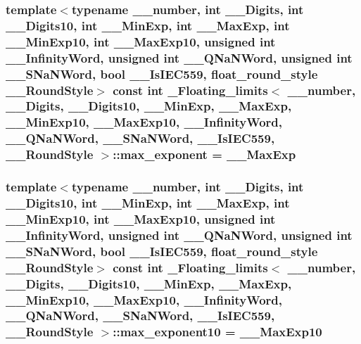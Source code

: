 \subsubsection[{max\+\_\+exponent}]{\setlength{\rightskip}{0pt plus 5cm}template$<$typename \+\_\+\+\_\+number, int \+\_\+\+\_\+\+Digits, int \+\_\+\+\_\+\+Digits10, int \+\_\+\+\_\+\+Min\+Exp, int \+\_\+\+\_\+\+Max\+Exp, int \+\_\+\+\_\+\+Min\+Exp10, int \+\_\+\+\_\+\+Max\+Exp10, unsigned int \+\_\+\+\_\+\+Infinity\+Word, unsigned int \+\_\+\+\_\+\+Q\+Na\+N\+Word, unsigned int \+\_\+\+\_\+\+S\+Na\+N\+Word, bool \+\_\+\+\_\+\+Is\+I\+E\+C559, float\+\_\+round\+\_\+style \+\_\+\+\_\+\+Round\+Style$>$ const int {\bf \+\_\+\+Floating\+\_\+limits}$<$ \+\_\+\+\_\+number, \+\_\+\+\_\+\+Digits, \+\_\+\+\_\+\+Digits10, \+\_\+\+\_\+\+Min\+Exp, \+\_\+\+\_\+\+Max\+Exp, \+\_\+\+\_\+\+Min\+Exp10, \+\_\+\+\_\+\+Max\+Exp10, \+\_\+\+\_\+\+Infinity\+Word, \+\_\+\+\_\+\+Q\+Na\+N\+Word, \+\_\+\+\_\+\+S\+Na\+N\+Word, \+\_\+\+\_\+\+Is\+I\+E\+C559, \+\_\+\+\_\+\+Round\+Style $>$\+::max\+\_\+exponent = \+\_\+\+\_\+\+Max\+Exp\hspace{0.3cm}{\ttfamily [static]}}\label{class__Floating__limits_a255ad0aea1d240e3f78d370b76984e2a}
\hypertarget{class__Floating__limits_a7e0e6cfca6c88235b2b5d3e09eae456d}{}
\subsubsection[{max\+\_\+exponent10}]{\setlength{\rightskip}{0pt plus 5cm}template$<$typename \+\_\+\+\_\+number, int \+\_\+\+\_\+\+Digits, int \+\_\+\+\_\+\+Digits10, int \+\_\+\+\_\+\+Min\+Exp, int \+\_\+\+\_\+\+Max\+Exp, int \+\_\+\+\_\+\+Min\+Exp10, int \+\_\+\+\_\+\+Max\+Exp10, unsigned int \+\_\+\+\_\+\+Infinity\+Word, unsigned int \+\_\+\+\_\+\+Q\+Na\+N\+Word, unsigned int \+\_\+\+\_\+\+S\+Na\+N\+Word, bool \+\_\+\+\_\+\+Is\+I\+E\+C559, float\+\_\+round\+\_\+style \+\_\+\+\_\+\+Round\+Style$>$ const int {\bf \+\_\+\+Floating\+\_\+limits}$<$ \+\_\+\+\_\+number, \+\_\+\+\_\+\+Digits, \+\_\+\+\_\+\+Digits10, \+\_\+\+\_\+\+Min\+Exp, \+\_\+\+\_\+\+Max\+Exp, \+\_\+\+\_\+\+Min\+Exp10, \+\_\+\+\_\+\+Max\+Exp10, \+\_\+\+\_\+\+Infinity\+Word, \+\_\+\+\_\+\+Q\+Na\+N\+Word, \+\_\+\+\_\+\+S\+Na\+N\+Word, \+\_\+\+\_\+\+Is\+I\+E\+C559, \+\_\+\+\_\+\+Round\+Style $>$\+::max\+\_\+exponent10 = \+\_\+\+\_\+\+Max\+Exp10\hspace{0.3cm}{\ttfamily [static]}}\label{class__Floating__limits_a7e0e6cfca6c88235b2b5d3e09eae456d}
\hypertarget{class__Floating__limits_a5814f067642ab3448ece1a803e571a6d}{}
